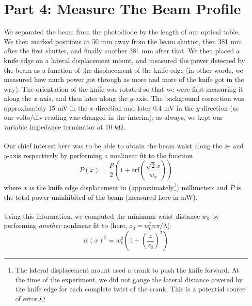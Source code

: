 \documentclass[10pt,a4paper]{article}
\begin{document}
\section*{Part 4: Measure The Beam Profile}
We separated the beam from the photodiode by the length of our optical table. We then marked positions at 50 mm away from the beam shutter, then 381 mm after the first shutter, and finally another 381 mm after that. We then placed a knife edge on a lateral displacement mount, and measured the power detected by the beam as a function of the displacement of the knife edge (in other words, we measured how much power got through as more and more of the knife got in the way). The orientation of the knife was rotated so that we were first measuring it along the $x$-axis, and then later along the $y$-axis. The background correction was approximately 15 mV in the $x$-direction and later $0.4$ mV in the $y$-direction (as our volts/div reading was changed in the interim); as always, we kept our variable impedance terminator at 10 $k\Omega$. \\
\\
Our chief interest here was to be able to obtain the beam waist along the $x$- and $y$-axis respectively by performing a nonlinear fit to the function $$P(x) = \dfrac{P}{2}\left(1 + \mathrm{erf}\left(\dfrac{\sqrt{2}x}{w_{x}}\right)\right)$$ where $x$ is the knife edge displacement in (approximately\footnote{The lateral displacement mount used a crank to push the knife forward. At the time of the experiment, we did not gauge the lateral distance covered by the knife edge for each complete twist of the crank. This is a potential source of error.}) millimeters and $P$ is the total power uninhibited of the beam (measured here in mW).\\
\\
Using this information, we computed the minimum waist distance $w_{0}$ by performing \textit{another} nonlinear fit to (here, $z_{0} = w_{0}^{2}n\pi/\lambda$): $$w(x)^{2} = w_{0}^{2}\left(1 + \left(\dfrac{z}{z_{0}}\right)^{2}\right)$$ 
\end{document}

